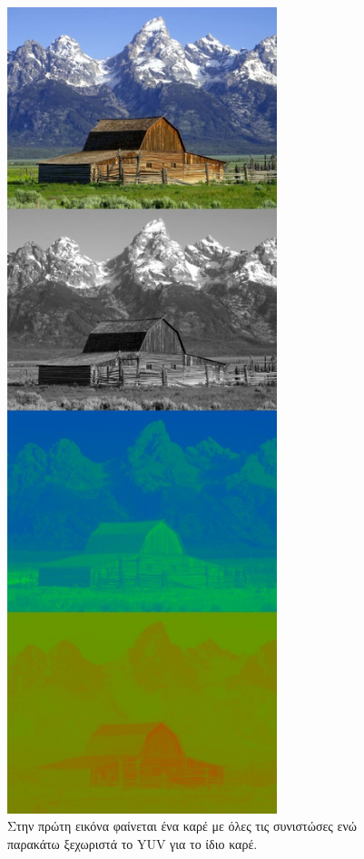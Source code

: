 \begin{figure}[H]
    \centering
        \includegraphics[totalheight=0.87\textheight,width=0.7\textwidth]{chapter2/yuv.jpg}
    \caption{Στην πρώτη εικόνα φαίνεται ένα καρέ με όλες τις συνιστώσες ενώ παρακάτω ξεχωριστά το YUV για το ίδιο καρέ.}
    \label{fig:yuv}
\end{figure}

